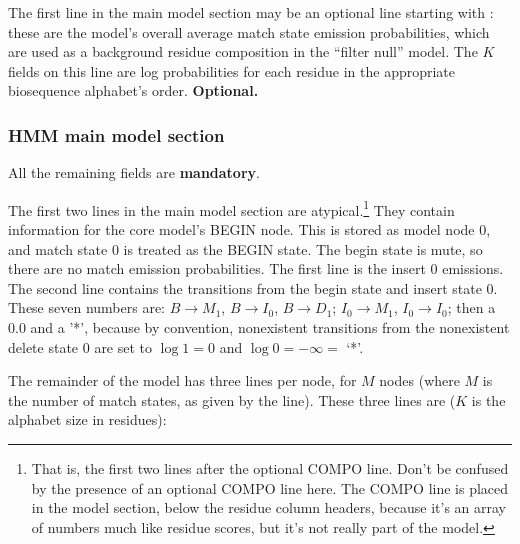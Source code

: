 \begin{sreitems}{}
\item [\emprog{COMPO <f>*K}] The first line in the main model section
may be an optional line starting with : these are the
model's overall average match state emission probabilities, which are
used as a background residue composition in the ``filter null''
model. The $K$ fields on this line are log probabilities for each
residue in the appropriate biosequence alphabet's
order. \textbf{Optional.}

\end{sreitems}

\subsubsection{HMM main model section}

All the remaining fields are \textbf{mandatory}.

The first two lines in the main model section are
atypical.\footnote{That is, the first two lines after the optional
  COMPO line. Don't be confused by the presence of an optional COMPO
  line here. The COMPO line is placed in the model section, below the
  residue column headers, because it's an array of numbers much like
  residue scores, but it's not really part of the model.}  They
contain information for the core model's BEGIN node. This is stored as
model node 0, and match state 0 is treated as the BEGIN state.  The
begin state is mute, so there are no match emission probabilities. The
first line is the insert 0 emissions. The second line contains the
transitions from the begin state and insert state 0.  These seven
numbers are: $B \rightarrow M_1$, $B \rightarrow I_0$, $B \rightarrow
D_1$; $I_0 \rightarrow M_1$, $I_0 \rightarrow I_0$; then a 0.0 and a
'*', because by convention, nonexistent transitions from the
nonexistent delete state 0 are set to $\log 1 = 0$ and $\log 0 =
-\infty = $ `*'.

The remainder of the model has three lines per node, for $M$ nodes
(where $M$ is the number of match states, as given by the 
line). These three lines are ($K$ is the alphabet size in residues):

